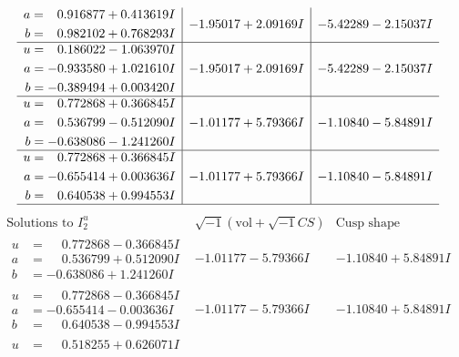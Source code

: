 \documentclass[1p]{elsarticle_modified}
\theoremstyle{definition}
\newcommand{\I}{\sqrt{-1}}
\begin{document}
$$\begin{array}{c|c|c}
\begin{aligned}
a &= \phantom{-}0.916877 + 0.413619 I \\
b &= \phantom{-}0.982102 + 0.768293 I\end{aligned}
 & -1.95017 + 2.09169 I & -5.42289 - 2.15037 I \\ \hline\begin{aligned}
u &= \phantom{-}0.186022 - 1.063970 I \\
a &= -0.933580 + 1.021610 I \\
b &= -0.389494 + 0.003420 I\end{aligned}
 & -1.95017 + 2.09169 I & -5.42289 - 2.15037 I \\ \hline\begin{aligned}
u &= \phantom{-}0.772868 + 0.366845 I \\
a &= \phantom{-}0.536799 - 0.512090 I \\
b &= -0.638086 - 1.241260 I\end{aligned}
 & -1.01177 + 5.79366 I & -1.10840 - 5.84891 I \\ \hline\begin{aligned}
u &= \phantom{-}0.772868 + 0.366845 I \\
a &= -0.655414 + 0.003636 I \\
b &= \phantom{-}0.640538 + 0.994553 I\end{aligned}
 & -1.01177 + 5.79366 I & -1.10840 - 5.84891 I\\
 \hline 
 \end{array}$$\newpage$$\begin{array}{c|c|c}  
\text{Solutions to }I^u_{2}& \I (\text{vol} + \sqrt{-1}CS) & \text{Cusp shape}\\
 \hline 
\begin{aligned}
u &= \phantom{-}0.772868 - 0.366845 I \\
a &= \phantom{-}0.536799 + 0.512090 I \\
b &= -0.638086 + 1.241260 I\end{aligned}
 & -1.01177 - 5.79366 I & -1.10840 + 5.84891 I \\ \hline\begin{aligned}
u &= \phantom{-}0.772868 - 0.366845 I \\
a &= -0.655414 - 0.003636 I \\
b &= \phantom{-}0.640538 - 0.994553 I\end{aligned}
 & -1.01177 - 5.79366 I & -1.10840 + 5.84891 I \\ \hline\begin{aligned}
u &= \phantom{-}0.518255 + 0.626071 I \\

\end{aligned}
\end{array}$$
\end{document}
